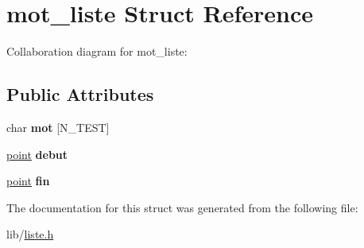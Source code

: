 \hypertarget{structmot__liste}{}\section{mot\+\_\+liste Struct Reference}
\label{structmot__liste}


Collaboration diagram for mot\+\_\+liste\+:
\subsection*{Public Attributes}
\begin{DoxyCompactItemize}
\item 
\mbox{\label{structmot__liste_a33fd27e8a1128dc1e2cd230a00e495fa}} 
char {\bfseries mot} \mbox{[}N\+\_\+\+T\+E\+ST\mbox{]}
\item 
\mbox{\label{structmot__liste_a3a5d67d4a03d29b5190f871705cf480e}} 
\hyperlink{structpoint}{point} {\bfseries debut}
\item 
\mbox{\label{structmot__liste_ac92a2c0507c8ca991168906ffe92eb50}} 
\hyperlink{structpoint}{point} {\bfseries fin}
\end{DoxyCompactItemize}


The documentation for this struct was generated from the following file\+:\begin{DoxyCompactItemize}
\item 
lib/\hyperlink{liste_8h}{liste.\+h}\end{DoxyCompactItemize}
